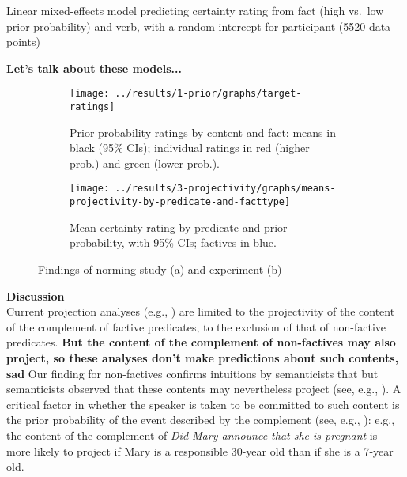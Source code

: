 \documentclass[12pt,fleqn]{article}
\newcommand{\6}{\mbox{$[\hspace*{-.6mm}[$}}
\newcommand{\9}{\mbox{$]\hspace*{-.6mm}]$}}
\begin{document}
Linear mixed-effects model predicting certainty rating from fact (high vs.\ low prior probability) and verb, with a random intercept for participant (5520 data points)

{\bf Let's talk about these models...}

\begin{figure}[h!]

\begin{subfigure}{.47\textwidth}
\centering
\texttt{[image: ../results/1-prior/graphs/target-ratings]}
\caption{Prior probability ratings by content and fact: means in black (95\% CIs); individual ratings in red (higher prob.) and green (lower prob.).}\label{f-prior}
\end{subfigure}%
\hspace*{.1cm}
\begin{subfigure}{.47\textwidth}
\centering
\texttt{[image: ../results/3-projectivity/graphs/means-projectivity-by-predicate-and-facttype]}
\caption{Mean certainty rating by predicate and prior probability, with 95\% CIs; factives in blue.}\label{f-proj}
\end{subfigure}

\caption{Findings of norming study (a) and experiment (b)}
\end{figure}

\noindent
{\bf Discussion}
\\
Current projection analyses (e.g., \citealt{heim83,vds92,abrusan2011,brst-salt10,brst-ar}) are limited to the projectivity of the content of the complement of factive predicates, to the exclusion of that of non-factive predicates. {\bf But the content of the complement of non-factives may also project, so these analyses don't make predictions about such contents, sad} Our finding for non-factives confirms intuitions by semanticists that but semanticists observed that these contents may nevertheless project (see, e.g., \citealt{schlenker10,anand-hacquard2014,spector-egre2015}). A critical factor in whether the speaker is taken to be committed to such content is the prior probability of the event described by the complement (see, e.g., \citealt{schlenker10}): e.g., the content of the complement of {\em Did Mary announce that she is pregnant} is more likely to project if Mary is a responsible 30-year old than if she is a 7-year old. 
\end{document}
